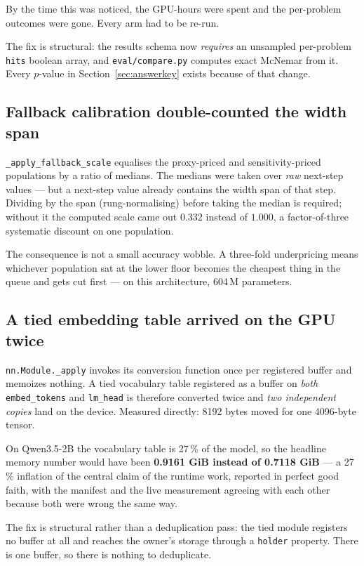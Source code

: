 \documentclass[11pt]{article}
\newcommand{\pct}{\,\%}
\newcommand{\code}[1]{\texttt{#1}}
\begin{document}
By the time this was noticed, the GPU-hours were spent and the per-problem outcomes were gone.
Every arm had to be re-run.

The fix is structural: the results schema now \emph{requires} an unsampled per-problem \code{hits}
boolean array, and \code{eval/compare.py} computes exact McNemar from it. Every $p$-value in
Section~\ref{sec:answerkey} exists because of that change.

\subsection{Fallback calibration double-counted the width span}

\code{\_apply\_fallback\_scale} equalises the proxy-priced and sensitivity-priced populations by a
ratio of medians. The medians were taken over \emph{raw} next-step values --- but a next-step value
already contains the width span of that step. Dividing by the span (rung-normalising) before
taking the median is required; without it the computed scale came out $0.332$ instead of
$1.000$, a factor-of-three systematic discount on one population.

The consequence is not a small accuracy wobble. A three-fold underpricing means whichever
population sat at the lower floor becomes the cheapest thing in the queue and gets cut first ---
on this architecture, 604\,M parameters.

\subsection{A tied embedding table arrived on the GPU twice}

\code{nn.Module.\_apply} invokes its conversion function once per registered buffer and memoizes
nothing. A tied vocabulary table registered as a buffer on \emph{both} \code{embed\_tokens} and
\code{lm\_head} is therefore converted twice and \emph{two independent copies} land on the
device. Measured directly: 8192 bytes moved for one 4096-byte tensor.

On Qwen3.5-2B the vocabulary table is 27\pct{} of the model, so the headline memory number would
have been \textbf{0.9161 GiB instead of 0.7118 GiB} --- a 27\pct{} inflation of the central
claim of the runtime work, reported in perfect good faith, with the manifest and the live
measurement agreeing with each other because both were wrong the same way.

The fix is structural rather than a deduplication pass: the tied module registers no buffer at
all and reaches the owner's storage through a \code{holder} property. There is one buffer, so
there is nothing to deduplicate.
\end{document}
